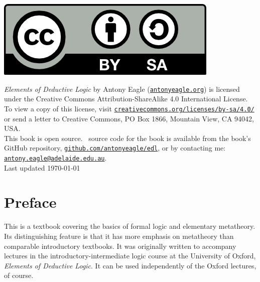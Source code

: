 \documentclass[openany,leqno,11pt,draft]{book}
\theoremstyle{break}
\theoremstyle{definition}
\theoremstyle{remark}
\begin{document}
\thispagestyle{empty}
\vspace{2cm}
\begin{center}
    
	\includegraphics{by-sa.png} \vspace{1cm}



{\small    	\emph{Elements of Deductive Logic} by Antony Eagle (\href{http://antonyeagle.org}{\nolinkurl{antonyeagle.org}}) is	licensed under the Creative Commons Attribution-ShareAlike 4.0 International License.\\[1cm]

To view a copy of this license, visit \href{http://creativecommons.org/licenses/by-sa/4.0/}{\nolinkurl{creativecommons.org/licenses/by-sa/4.0/}} or send a letter to Creative Commons, PO Box 1866, Mountain View, CA 94042, USA.\\[1cm]

This book is open source. \XeLaTeX\ source code for the book is available from the book's GitHub repository, \href{https://github.com/antonyeagle/edl}{\nolinkurl{github.com/antonyeagle/edl}}, or by contacting me: \href{mailto:antony.eagle@adelaide.edu.au}{\nolinkurl{antony.eagle@adelaide.edu.au}}.\\[4cm]

    Last updated  \today\\[1cm]
    


}

\end{center}


\pagestyle{fancy}

\chapter*{Preface}

This is a textbook covering the basics of formal logic and elementary metatheory. Its distinguishing feature is that it has more emphasis on metatheory than comparable introductory textbooks. It was originally written to accompany lectures in the introductory-intermediate logic course at the University of Oxford, \emph{Elements of Deductive Logic}. It can be used independently of the Oxford lectures, of course. 
\end{document}
